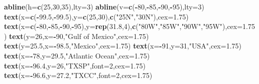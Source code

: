 \documentclass[11pt,]{article}
\newenvironment{Shaded}{\begin{snugshade}}{\end{snugshade}}
\newcommand{\KeywordTok}[1]{\textcolor[rgb]{0.13,0.29,0.53}{\textbf{#1}}}
\newcommand{\DataTypeTok}[1]{\textcolor[rgb]{0.13,0.29,0.53}{#1}}
\newcommand{\DecValTok}[1]{\textcolor[rgb]{0.00,0.00,0.81}{#1}}
\newcommand{\FloatTok}[1]{\textcolor[rgb]{0.00,0.00,0.81}{#1}}
\newcommand{\StringTok}[1]{\textcolor[rgb]{0.31,0.60,0.02}{#1}}
\newcommand{\OperatorTok}[1]{\textcolor[rgb]{0.81,0.36,0.00}{\textbf{#1}}}
\newcommand{\NormalTok}[1]{#1}
\begin{document}
\begin{Shaded}
\begin{Highlighting}[]
\KeywordTok{abline}\NormalTok{(}\DataTypeTok{h=}\KeywordTok{c}\NormalTok{(}\DecValTok{25}\NormalTok{,}\DecValTok{30}\NormalTok{,}\DecValTok{35}\NormalTok{),}\DataTypeTok{lty=}\DecValTok{3}\NormalTok{)}
\KeywordTok{abline}\NormalTok{(}\DataTypeTok{v=}\KeywordTok{c}\NormalTok{(}\OperatorTok{-}\DecValTok{80}\NormalTok{,}\OperatorTok{-}\DecValTok{85}\NormalTok{,}\OperatorTok{-}\DecValTok{90}\NormalTok{,}\OperatorTok{-}\DecValTok{95}\NormalTok{),}\DataTypeTok{lty=}\DecValTok{3}\NormalTok{)}
\KeywordTok{text}\NormalTok{(}\DataTypeTok{x=}\KeywordTok{c}\NormalTok{(}\OperatorTok{-}\FloatTok{99.5}\NormalTok{,}\OperatorTok{-}\FloatTok{99.5}\NormalTok{),}\DataTypeTok{y=}\KeywordTok{c}\NormalTok{(}\DecValTok{25}\NormalTok{,}\DecValTok{30}\NormalTok{),}\KeywordTok{c}\NormalTok{(}\StringTok{"25N"}\NormalTok{,}\StringTok{"30N"}\NormalTok{),}\DataTypeTok{cex=}\FloatTok{1.75}\NormalTok{)}
\KeywordTok{text}\NormalTok{(}\DataTypeTok{x=}\KeywordTok{c}\NormalTok{(}\OperatorTok{-}\DecValTok{80}\NormalTok{,}\OperatorTok{-}\DecValTok{85}\NormalTok{,}\OperatorTok{-}\DecValTok{90}\NormalTok{,}\OperatorTok{-}\DecValTok{95}\NormalTok{),}\DataTypeTok{y=}\KeywordTok{rep}\NormalTok{(}\FloatTok{31.8}\NormalTok{,}\DecValTok{4}\NormalTok{),}\KeywordTok{c}\NormalTok{(}\StringTok{"80W"}\NormalTok{,}\StringTok{"85W"}\NormalTok{,}\StringTok{"90W"}\NormalTok{,}\StringTok{"95W"}\NormalTok{),}\DataTypeTok{cex=}\FloatTok{1.75}\NormalTok{)}
\KeywordTok{text}\NormalTok{(}\DataTypeTok{y=}\DecValTok{26}\NormalTok{,}\DataTypeTok{x=}\OperatorTok{-}\DecValTok{90}\NormalTok{,}\StringTok{"Gulf of Mexico"}\NormalTok{,}\DataTypeTok{cex=}\FloatTok{1.75}\NormalTok{)}
\KeywordTok{text}\NormalTok{(}\DataTypeTok{y=}\FloatTok{25.5}\NormalTok{,}\DataTypeTok{x=}\OperatorTok{-}\FloatTok{98.5}\NormalTok{,}\StringTok{"Mexico"}\NormalTok{,}\DataTypeTok{cex=}\FloatTok{1.75}\NormalTok{)}
\KeywordTok{text}\NormalTok{(}\DataTypeTok{x=}\OperatorTok{-}\DecValTok{91}\NormalTok{,}\DataTypeTok{y=}\DecValTok{31}\NormalTok{,}\StringTok{"USA"}\NormalTok{,}\DataTypeTok{cex=}\FloatTok{1.75}\NormalTok{)}
\KeywordTok{text}\NormalTok{(}\DataTypeTok{x=}\OperatorTok{-}\DecValTok{78}\NormalTok{,}\DataTypeTok{y=}\FloatTok{29.5}\NormalTok{,}\StringTok{"Atlantic Ocean"}\NormalTok{,}\DataTypeTok{cex=}\FloatTok{1.75}\NormalTok{)}
\KeywordTok{text}\NormalTok{(}\DataTypeTok{x=}\OperatorTok{-}\FloatTok{96.4}\NormalTok{,}\DataTypeTok{y=}\DecValTok{26}\NormalTok{,}\StringTok{"TXSP"}\NormalTok{,}\DataTypeTok{font=}\DecValTok{2}\NormalTok{,}\DataTypeTok{cex=}\FloatTok{1.75}\NormalTok{)}
\KeywordTok{text}\NormalTok{(}\DataTypeTok{x=}\OperatorTok{-}\FloatTok{96.6}\NormalTok{,}\DataTypeTok{y=}\FloatTok{27.2}\NormalTok{,}\StringTok{"TXCC"}\NormalTok{,}\DataTypeTok{font=}\DecValTok{2}\NormalTok{,}\DataTypeTok{cex=}\FloatTok{1.75}\NormalTok{)}

\end{Highlighting}
\end{Shaded}
\end{document}
